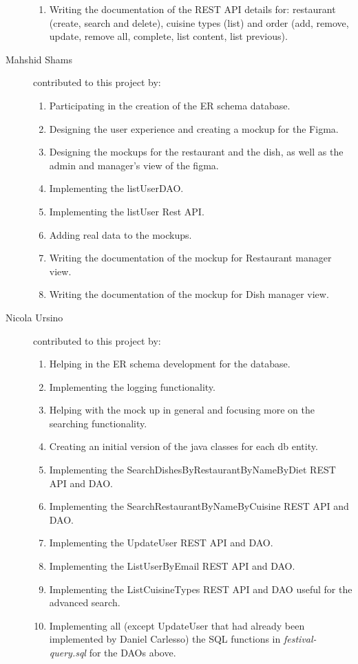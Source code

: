 \begin{description}
\begin{enumerate}
			\item Writing the documentation of the REST API details for: restaurant (create, search and delete), cuisine types (list) and order (add, remove, update, remove all, complete, list content, list previous).
		\end{enumerate}
	\item[Mahshid Shams] contributed to this project by:
	\begin{enumerate}
    			\item Participating in the creation of the ER schema database.
    			\item Designing the user experience and creating a mockup for the Figma.
    			\item Designing the mockups for the restaurant and the dish, as well as the admin and manager's view of the figma.
    			\item Implementing the listUserDAO.
    			\item Implementing the listUser Rest API.
    			\item Adding real data to the mockups.
    			\item Writing the documentation of the mockup for Restaurant manager view.
    			\item Writing the documentation of the mockup for Dish manager view.
    		\end{enumerate}
	\item[Nicola Ursino] contributed to this project by:
		\begin{enumerate}
		\item Helping in the ER schema development for the database.
		\item Implementing the logging functionality.
		\item Helping with the mock up in general and focusing more on the searching functionality.		
		\item Creating an initial version of the java classes for each db entity.
		\item Implementing the SearchDishesByRestaurantByNameByDiet REST API and DAO.
		\item Implementing the SearchRestaurantByNameByCuisine REST API and DAO.
		\item Implementing the UpdateUser REST API and DAO.
		\item Implementing the ListUserByEmail REST API and DAO.
		\item Implementing the ListCuisineTypes REST API and DAO useful for the advanced search.
		\item Implementing all (except UpdateUser that had already been implemented by Daniel Carlesso) the SQL functions in \textit{festival-query.sql} for the DAOs above.

\end{enumerate}
\end{description}
